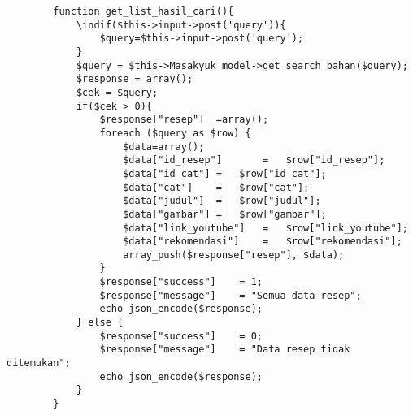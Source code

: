 \documentclass{jtetiskripsi}
\begin{document}
\begin{verbatim}
		function get_list_hasil_cari(){
			\indif($this->input->post('query')){
				$query=$this->input->post('query');
			}
			$query = $this->Masakyuk_model->get_search_bahan($query);
			$response = array();
			$cek = $query;
			if($cek > 0){
				$response["resep"]	=array();
				foreach ($query as $row) {
					$data=array();
					$data["id_resep"]		=	$row["id_resep"];
					$data["id_cat"]	=	$row["id_cat"];
					$data["cat"]	=	$row["cat"];
					$data["judul"]	=	$row["judul"];
					$data["gambar"]	=	$row["gambar"];
					$data["link_youtube"]	=	$row["link_youtube"];
					$data["rekomendasi"]	=	$row["rekomendasi"];
					array_push($response["resep"], $data);
				}
				$response["success"]	= 1;
				$response["message"]	= "Semua data resep";
				echo json_encode($response);
			} else {
				$response["success"]	= 0;
				$response["message"]	= "Data resep tidak ditemukan";
				echo json_encode($response);
			}
		}		
	\end{verbatim}	



\end{document}
